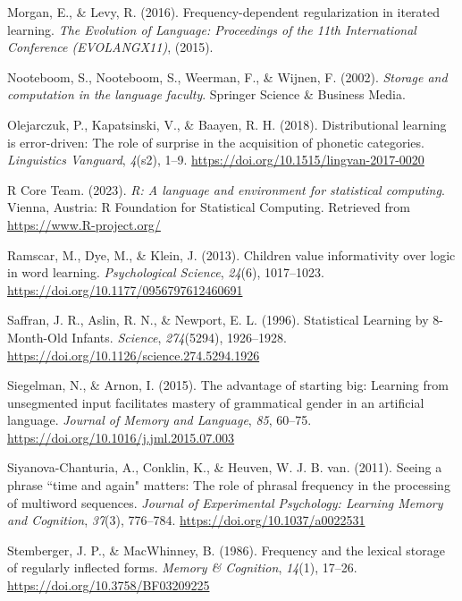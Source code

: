 \documentclass[
  man,floatsintext]{apa6}
\newlength{\cslhangindent}
\newenvironment{CSLReferences}[2] %
 {\begin{list}{}{%
  \setlength{\itemindent}{0pt}
  \setlength{\leftmargin}{0pt}
  \setlength{\parsep}{0pt}
  \ifodd #1
   \setlength{\leftmargin}{\cslhangindent}
   \setlength{\itemindent}{-1\cslhangindent}
  \fi
  \setlength{\itemsep}{#2\baselineskip}}}
 {\end{list}}
\begin{document}
\begin{CSLReferences}{1}{0}
Morgan, E., \& Levy, R. (2016). Frequency-dependent regularization in iterated learning. \emph{The Evolution of Language: Proceedings of the 11th International Conference (EVOLANGX11)}, (2015).

Nooteboom, S., Nooteboom, S., Weerman, F., \& Wijnen, F. (2002). \emph{Storage and computation in the language faculty}. Springer Science \& Business Media.

Olejarczuk, P., Kapatsinski, V., \& Baayen, R. H. (2018). Distributional learning is error-driven: The role of surprise in the acquisition of phonetic categories. \emph{Linguistics Vanguard}, \emph{4}(s2), 1--9. \url{https://doi.org/10.1515/lingvan-2017-0020}

R Core Team. (2023). \emph{R: A language and environment for statistical computing}. Vienna, Austria: R Foundation for Statistical Computing. Retrieved from \url{https://www.R-project.org/}

Ramscar, M., Dye, M., \& Klein, J. (2013). Children value informativity over logic in word learning. \emph{Psychological Science}, \emph{24}(6), 1017--1023. \url{https://doi.org/10.1177/0956797612460691}

Saffran, J. R., Aslin, R. N., \& Newport, E. L. (1996). Statistical Learning by 8-Month-Old Infants. \emph{Science}, \emph{274}(5294), 1926--1928. \url{https://doi.org/10.1126/science.274.5294.1926}

Siegelman, N., \& Arnon, I. (2015). The advantage of starting big: Learning from unsegmented input facilitates mastery of grammatical gender in an artificial language. \emph{Journal of Memory and Language}, \emph{85}, 60--75. \url{https://doi.org/10.1016/j.jml.2015.07.003}

Siyanova-Chanturia, A., Conklin, K., \& Heuven, W. J. B. van. (2011). Seeing a phrase {``}time and again{"} matters: The role of phrasal frequency in the processing of multiword sequences. \emph{Journal of Experimental Psychology: Learning Memory and Cognition}, \emph{37}(3), 776--784. \url{https://doi.org/10.1037/a0022531}

Stemberger, J. P., \& MacWhinney, B. (1986). Frequency and the lexical storage of regularly inflected forms. \emph{Memory \& Cognition}, \emph{14}(1), 17--26. \url{https://doi.org/10.3758/BF03209225}


\end{CSLReferences}
\end{document}
